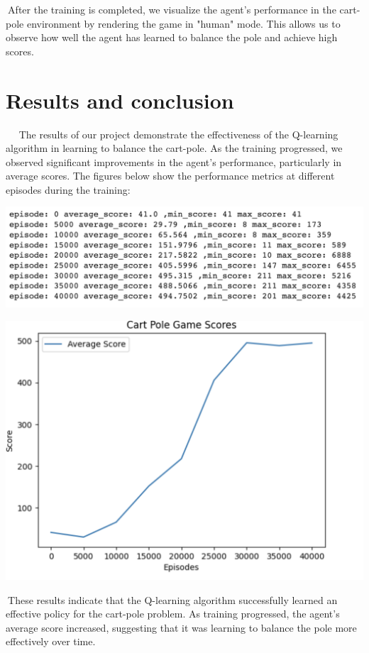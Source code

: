 \documentclass{article}
\begin{document}
$\>$After the training is completed, we visualize the agent's performance in the cart-pole environment by rendering the game in "human" mode. This allows us to observe how well the agent has learned to balance the pole and achieve high scores.

\section{Results and conclusion}

$\>$    $\>$   $\>$The results of our project demonstrate the effectiveness of the Q-learning algorithm in learning to balance the cart-pole. As the training progressed, we observed significant improvements in the agent's performance, particularly in average scores. The figures below show the performance metrics at different episodes during the training:
 
 
 
 
 \includegraphics[scale = 0.6]{image1}
 
  \includegraphics[scale = 0.4]{image2}
  
$\>$These results indicate that the Q-learning algorithm successfully learned an effective policy for the cart-pole problem. As training progressed, the agent's average score increased, suggesting that it was learning to balance the pole more effectively over time. 
 
\end{document}
